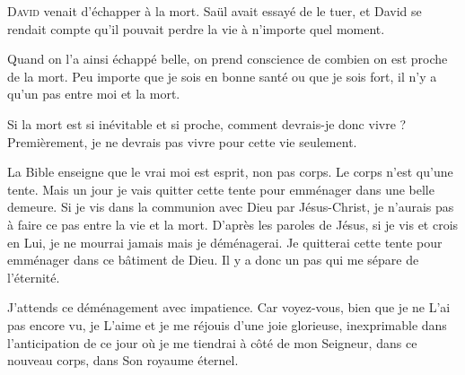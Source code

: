 

\lettrine{D}{avid} venait d'échapper à la mort.
 Saül avait essayé de le tuer, et David se rendait compte
 qu'il pouvait perdre la vie à n'importe quel moment.

Quand on l'a ainsi échappé belle, on prend conscience de combien
 on est proche de la mort.
 Peu importe que je sois en bonne santé ou que je sois fort,
 il n'y a qu'un pas entre moi et la mort.

Si la mort est si inévitable et si proche, comment devrais-je donc vivre ?
 Premièrement, je ne devrais pas vivre pour cette vie seulement.


La Bible enseigne que le vrai moi est esprit, non pas corps.
 Le corps n'est qu'une tente. Mais un jour je vais quitter cette tente
 pour emménager dans une belle demeure.
 Si je vis dans la communion avec Dieu par Jésus-Christ,
 je n'aurais pas à faire ce pas entre la vie et la mort.
 D'après les paroles de Jésus, si je vis et crois en Lui, je ne mourrai jamais
 \ocadr mais je déménagerai.
 Je quitterai cette tente pour emménager dans ce bâtiment de Dieu.
 Il y a donc un pas qui me sépare de l'éternité.

J'attends ce déménagement avec impatience.
 Car voyez-vous, bien que je ne L'ai pas encore vu,
 je L'aime et je me réjouis d'une joie glorieuse,
 inexprimable dans l'anticipation de ce jour où je me tiendrai
 à côté de mon Seigneur, dans ce nouveau corps, dans Son royaume éternel. 

\dvrule







